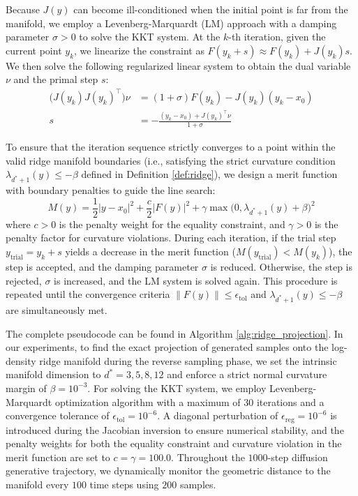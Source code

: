 \documentclass[11pt]{article}
\begin{document}
Because $J(y)$ can become ill-conditioned when the initial point is far from the manifold, we employ a Levenberg-Marquardt (LM) approach with a damping parameter $\sigma > 0$ to solve the KKT system. At the $k$-th iteration, given the current point $y_k$, we linearize the constraint as $F(y_k + s) \approx F(y_k) + J(y_k)s$. We then solve the following regularized linear system to obtain the dual variable $\nu$ and the primal step $s$:
\begin{equation}
\begin{aligned}
\big(J(y_k) J(y_k)^\intercal \big) \nu &= (1 + \sigma) F(y_k) - J(y_k)(y_k - x_0) \\
s &= -\frac{(y_k - x_0) + J(y_k)^\intercal \nu}{1 + \sigma}
\end{aligned}
\end{equation}

To ensure that the iteration sequence strictly converges to a point within the valid ridge manifold boundaries (i.e., satisfying the strict curvature condition $\lambda_{d^*+1}(y) \le -\beta$ defined in Definition \ref{def:ridge}), we design a merit function with boundary penalties to guide the line search:\begin{equation}M(y) = \frac{1}{2} | y - x_0 |^2 + \frac{c}{2} | F(y) |^2 + \gamma \max\big(0, \lambda_{d^*+1}(y) + \beta\big)^2\end{equation}where $c > 0$ is the penalty weight for the equality constraint, and $\gamma > 0$ is the penalty factor for curvature violations. During each iteration, if the trial step $y_{\text{trial}} = y_k + s$ yields a decrease in the merit function ($M(y_{\text{trial}}) < M(y_k)$), the step is accepted, and the damping parameter $\sigma$ is reduced. Otherwise, the step is rejected, $\sigma$ is increased, and the LM system is solved again. This procedure is repeated until the convergence criteria $\|F(y)\| \le \epsilon_{\text{tol}}$ and $\lambda_{d^*+1}(y) \le -\beta$ are simultaneously met.

The complete pseudocode can be found in Algorithm \ref{alg:ridge_projection}. In our experiments, to find the exact projection of generated samples onto the log-density ridge manifold during the reverse sampling phase, we set the intrinsic manifold dimension to $d^*=3,5,8,12$ and enforce a strict normal curvature margin of $\beta=10^{-3}$. For solving the KKT system, we employ Levenberg-Marquardt optimization algorithm with a maximum of $30$ iterations and a convergence tolerance of $\epsilon_{\text{tol}}=10^{-6}$. A diagonal perturbation of $\epsilon_{\text{reg}}=10^{-6}$ is introduced during the Jacobian inversion to ensure numerical stability, and the penalty weights for both the equality constraint and curvature violation in the merit function are set to $c=\gamma=100.0$. Throughout the $1000$-step diffusion generative trajectory, we dynamically monitor the geometric distance to the manifold every $100$ time steps using $200$ samples.
\end{document}
